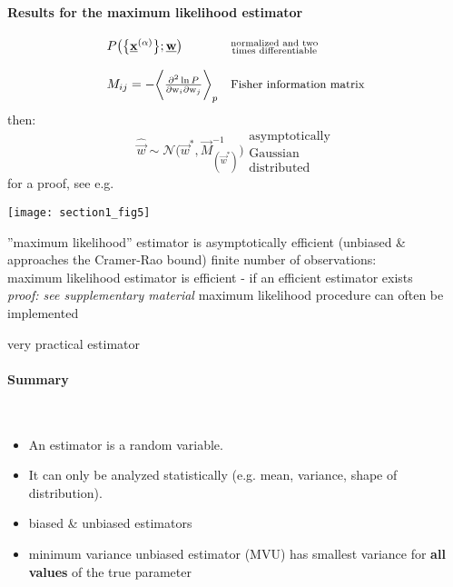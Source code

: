 \paragraph{Results for the maximum likelihood estimator}
\begin{equation}
        \begin{array}{ll}
                P\big(\big\{\vec{x}^{(\alpha)}\big\};\vec{w}\big)
                & \substack{ \text{normalized and two} \\
                                \text{times differentiable}} \\\\
                M_{ij} = -\bigg< \frac{\partial^2 \ln P}{\partial
                        \mathrm{w}_i \partial \mathrm{w}_j} \bigg>_p
                & \text{{\small Fisher information matrix}}
        \end{array}
\end{equation}
then:
\begin{equation}
        \widehat{\vec{w}} \sim \mathcal{N} \big( \vec{w}^*, 
                \vec{M}_{(\vec{w}^*)}^{-1} \big) 
                        \substack{ \text{asymptotically}\\
                        \text{Gaussian} \\ \text{distributed}}
\end{equation}
for a proof, see e.g. \textcite{Rao1973}
\begin{center}\texttt{[image: section1\_fig5]}
\end{center}
\begin{itemize}
        \itR ''maximum likelihood'' estimator is asymptotically efficient
                (unbiased \& approaches the Cramer-Rao bound)
        \itR finite number of observations: \\
                maximum likelihood estimator is efficient - if an efficient
                estimator exists\\
                {\it proof: see supplementary material}
        \itR maximum likelihood procedure can often be implemented
        \begin{itemize}
                \itl very practical estimator
        \end{itemize}
\end{itemize}

\paragraph{Summary}\mbox{}\\
\begin{itemize}
   \item An estimator is a random variable.
   \item It can only be analyzed statistically
    (e.g. mean, variance, shape of distribution).
\item biased \& unbiased estimators
\item minimum variance unbiased estimator (MVU) has smallest variance
  for \textbf{all values} of the true parameter
\end{itemize}  

